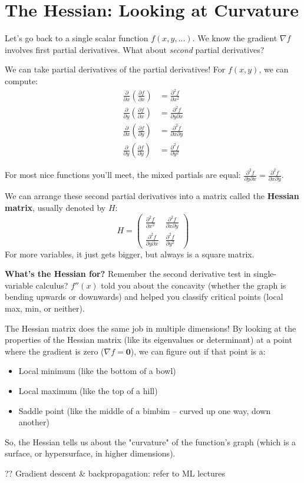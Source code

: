 \documentclass[11pt]{article}
\begin{document}
\section{The Hessian: Looking at Curvature}
Let's go back to a single scalar function $f(x, y, ...)$. We know the gradient $\nabla f$ involves first partial derivatives. What about \emph{second} partial derivatives?

We can take partial derivatives of the partial derivatives! For $f(x, y)$, we can compute:
\begin{align*}
    \frac{\partial}{\partial x} \left( \frac{\partial f}{\partial x} \right) &= \frac{\partial^2 f}{\partial x^2} \\\frac{\partial}{\partial y} \left( \frac{\partial f}{\partial x} \right) &= \frac{\partial^2 f}{\partial y \partial x}\\
    \frac{\partial}{\partial x} \left( \frac{\partial f}{\partial y} \right) &= \frac{\partial^2 f}{\partial x \partial y}\\
    \frac{\partial}{\partial y} \left( \frac{\partial f}{\partial y} \right) &= \frac{\partial^2 f}{\partial y^2}
\end{align*}

 For most nice functions you'll meet, the mixed partials are equal: $\frac{\partial^2 f}{\partial y \partial x} = \frac{\partial^2 f}{\partial x \partial y}$.

We can arrange these second partial derivatives into a matrix called the \textbf{Hessian matrix}, usually denoted by $H$:
$$ H = \begin{pmatrix} \frac{\partial^2 f}{\partial x^2} & \frac{\partial^2 f}{\partial x \partial y} \\ \frac{\partial^2 f}{\partial y \partial x} & \frac{\partial^2 f}{\partial y^2} \end{pmatrix} $$
For more variables, it just gets bigger, but always is a square matrix.

\textbf{What's the Hessian for?} Remember the second derivative test in single-variable calculus? $f''(x)$ told you about the concavity (whether the graph is bending upwards or downwards) and helped you classify critical points (local max, min, or neither).

The Hessian matrix does the same job in multiple dimensions! By looking at the properties of the Hessian matrix (like its eigenvalues or determinant) at a point where the gradient is zero ($\nabla f = \mathbf{0}$), we can figure out if that point is a:
\begin{itemize}
    \item Local minimum (like the bottom of a bowl)
    \item Local maximum (like the top of a hill)
    \item Saddle point (like the middle of a bimbim – curved up one way, down another)
\end{itemize}
So, the Hessian tells us about the "curvature" of the function's graph (which is a surface, or hypersurface, in higher dimensions).

?? Gradient descent \& backpropagation: refer to ML lectures
\end{document}
